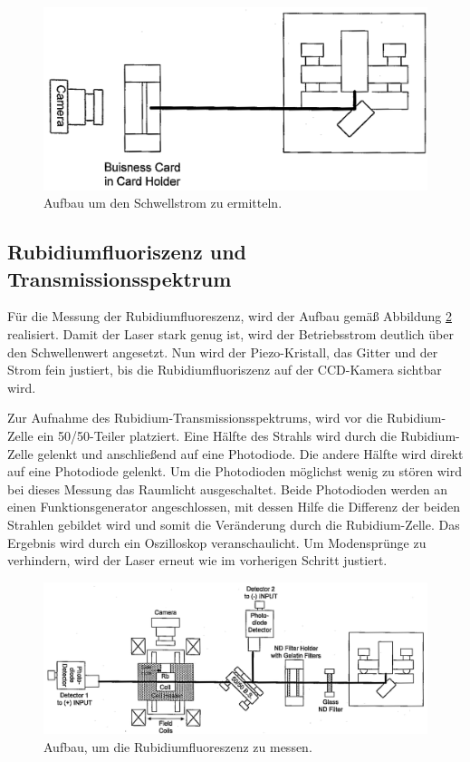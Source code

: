 \begin{figure}[H]
	\centering
	\includegraphics[width=\textwidth]{plots/setup_threshold.png}
	\caption{Aufbau um den Schwellstrom zu ermitteln. \cite{V60}}
	\label{fig:th}
\end{figure}

\subsection{Rubidiumfluoriszenz und Transmissionsspektrum}
\label{sec:Rubidium}

Für die Messung der Rubidiumfluoreszenz, wird der Aufbau gemäß Abbildung \ref{fig:sub} realisiert.
Damit der Laser stark genug ist, wird der Betriebsstrom deutlich über den Schwellenwert angesetzt.
Nun wird der Piezo-Kristall, das Gitter und der Strom fein justiert, bis die Rubidiumfluoriszenz auf der CCD-Kamera sichtbar wird.

Zur Aufnahme des Rubidium-Transmissionsspektrums, wird vor die Rubidium-Zelle ein 50/50-Teiler platziert.
Eine Hälfte des Strahls wird durch die Rubidium-Zelle gelenkt und anschließend auf eine Photodiode.
Die andere Hälfte wird direkt auf eine Photodiode gelenkt.
Um die Photodioden möglichst wenig zu stören wird bei dieses Messung das Raumlicht ausgeschaltet.
Beide Photodioden werden an einen Funktionsgenerator angeschlossen, mit dessen Hilfe die Differenz der beiden Strahlen gebildet wird und somit die Veränderung durch die Rubidium-Zelle.
Das Ergebnis wird durch ein Oszilloskop veranschaulicht.
Um Modensprünge zu verhindern, wird der Laser erneut wie im vorherigen Schritt justiert.


\begin{figure}[H]
	\centering
	\includegraphics[width=\textwidth]{plots/setup_substraction.png}
	\caption{Aufbau, um die Rubidiumfluoreszenz zu messen. \cite{V60}}
	\label{fig:sub}
\end{figure}